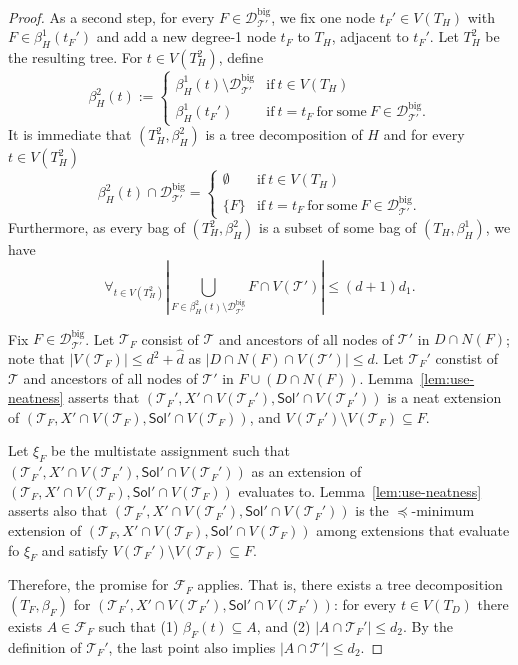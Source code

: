 \documentclass[11pt,a4paper]{article}
\theoremstyle{definition}
\def\T{\mathcal{T}}
\def\Sol{\mathsf{Sol}}
\begin{document}
\begin{proof}
As a second step, for every $F \in \mathcal{D}^\mathrm{big}_{\T'}$, we fix one node $t_F' \in V(T_H)$ with $F \in \beta_H^1(t_F')$ and add a new degree-1 node $t_F$ to $T_H$, adjacent to $t_F'$. 
Let $T_H^2$ be the resulting tree. For $t \in V(T_H^2)$, define
\[ \beta_H^2(t) := \begin{cases} \beta_H^1(t) \setminus \mathcal{D}^\mathrm{big}_{\T'} & \mathrm{if}\ t \in V(T_H)\\ \beta_H^1(t_F') &\mathrm{if}\ t=t_F\ \mathrm{for\ some\ }F \in \mathcal{D}^\mathrm{big}_{\T'}. \end{cases} \]
It is immediate that $(T_H^2,\beta_H^2)$ is a tree decomposition of $H$ and for every $t \in V(T_H^2)$
\[ \beta_H^2(t) \cap \mathcal{D}^\mathrm{big}_{\T'} = \begin{cases} \emptyset & \mathrm{if}\ t \in V(T_H) \\
    \{F\} & \mathrm{if}\ t=t_F\ \mathrm{for\ some\ }F \in \mathcal{D}^\mathrm{big}_{\T'}. \end{cases} \]
 Furthermore, as every bag of $(T_H^2,\beta_H^2)$ is a subset of some bag of $(T_H,\beta_H^1)$, we have
 \begin{equation}\label{eq:handle-bip:2bound}
   \forall_{t \in V(T_H^2)} \left|\bigcup_{F \in \beta_H^2(t) \setminus \mathcal{D}^\mathrm{big}_{\T'}} F \cap V(\T')\right| \leq  (d+1)d_1. 
 \end{equation}

 Fix $F \in \mathcal{D}^\mathrm{big}_{\T'}$.
 Let $\T_F$ consist of $\T$ and ancestors
 of all nodes of $\T'$ in $D \cap N(F)$; note that $|V(\T_F)| \leq d^2 + \widehat{d}$
 as $|D \cap N(F) \cap V(\T')| \leq d$.
 Let $\T_F'$ constist of $\T$ and ancestors
 of all nodes of $\T'$ in $F \cup (D \cap N(F))$. 
 Lemma~\ref{lem:use-neatness} asserts that 
 $(\T_F', X' \cap V(\T_F'), \Sol' \cap V(\T_F'))$ is a neat extension
 of $(\T_F, X' \cap V(\T_F), \Sol' \cap V(\T_F))$, 
 and $V(\T_F') \setminus V(\T_F) \subseteq F$.
 
 Let $\xi_F$ be the multistate assignment such that
 $(\T_F', X' \cap V(\T_F'), \Sol' \cap V(\T_F'))$ as an extension of
 $(\T_F, X' \cap V(\T_F), \Sol' \cap V(\T_F))$ evaluates to. 
 Lemma~\ref{lem:use-neatness} asserts also 
 that $(\T_F', X' \cap V(\T_F'), \Sol' \cap V(\T_F'))$ is the $\preceq$-minimum
 extension of $(\T_F, X' \cap V(\T_F), \Sol' \cap V(\T_F))$
 among extensions that evaluate fo $\xi_F$ and 
 satisfy $V(\T_F') \setminus V(\T_F) \subseteq F$.

Therefore, the promise for $\mathcal{F}_F$ applies.
That is, there exists a tree decomposition $(T_F,\beta_F)$ for $(\T_F',X' \cap V(\T_F'), \Sol' \cap V(\T_F'))$:
 for every $t \in V(T_D)$ there exists $A \in \mathcal{F}_F$ such that
  (1) $\beta_F(t) \subseteq A$, and (2) $|A \cap \T_F'| \leq d_2$. 
  By the definition of $\T_F'$, the last point also implies
  $|A \cap \T'| \leq d_2$.


\end{proof}
\end{document}
